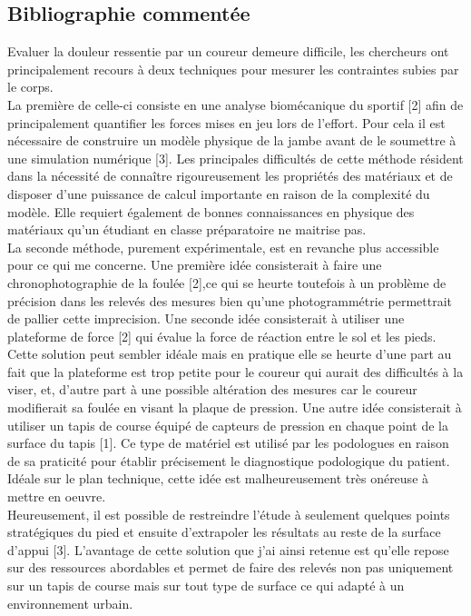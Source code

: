 \documentclass[11pt]{article}
\begin{document}
\subsection{Bibliographie commentée}
\label{sec:org4b226f3}
Evaluer la douleur ressentie par un coureur demeure difficile, les chercheurs ont principalement recours à deux techniques pour mesurer les contraintes subies par le corps.\\\empty
La première de celle-ci consiste en une analyse biomécanique du sportif [2] afin de principalement quantifier les forces mises en jeu lors de l'effort. Pour cela il est nécessaire de construire un modèle physique de la jambe avant de le soumettre à une simulation numérique [3]. Les principales difficultés de cette méthode résident dans la nécessité de connaître rigoureusement les propriétés des matériaux et de disposer d'une puissance de calcul importante en raison de la complexité du modèle. Elle requiert également de bonnes connaissances en physique des matériaux qu'un étudiant en classe préparatoire ne maitrise pas.\\\empty
La seconde méthode, purement expérimentale, est en revanche plus accessible pour ce qui me concerne. Une première idée consisterait à faire une chronophotographie de la foulée [2],ce qui se heurte toutefois à un problème de précision dans les relevés des mesures bien qu'une photogrammétrie permettrait de pallier cette imprecision. Une seconde idée consisterait à utiliser une plateforme de force [2] qui évalue la force de réaction entre le sol et les pieds. Cette solution peut sembler idéale mais en pratique elle se heurte d'une part au fait que la plateforme est trop petite pour le coureur qui aurait des difficultés à la viser, et, d'autre part à une possible altération des mesures car le coureur modifierait sa foulée en visant la plaque de pression. Une autre idée consisterait à utiliser un tapis de course équipé de capteurs de pression en chaque point de la surface du tapis [1]. Ce type de matériel est utilisé par les podologues en raison de sa praticité pour établir précisement le diagnostique podologique du patient. Idéale sur le plan technique, cette idée est malheureusement très onéreuse à mettre en oeuvre.\\\empty
Heureusement, il est possible de restreindre l'étude à seulement quelques points stratégiques du pied et ensuite d'extrapoler les résultats au reste de la surface d'appui [3]. L'avantage de cette solution que j'ai ainsi retenue est qu'elle repose sur des ressources abordables et permet de faire des relevés non pas uniquement sur un tapis de course mais sur tout type de surface ce qui adapté à un environnement urbain.\\\empty
\end{document}
